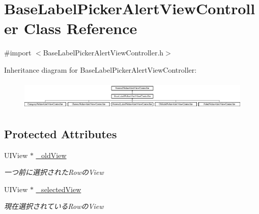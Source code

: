 \hypertarget{interface_base_label_picker_alert_view_controller}{
\section{BaseLabelPickerAlertViewController Class Reference}
\label{interface_base_label_picker_alert_view_controller}
}


{\ttfamily \#import $<$BaseLabelPickerAlertViewController.h$>$}

Inheritance diagram for BaseLabelPickerAlertViewController:\begin{figure}[H]
\begin{center}
\leavevmode
\includegraphics[height=1.411765cm]{interface_base_label_picker_alert_view_controller}
\end{center}
\end{figure}
\subsection*{Protected Attributes}
\begin{DoxyCompactItemize}
\item 
\hypertarget{interface_base_label_picker_alert_view_controller_a038c417b4ca94a77edc77b3893b18991}{
UIView $\ast$ \hyperlink{interface_base_label_picker_alert_view_controller_a038c417b4ca94a77edc77b3893b18991}{\_\-oldView}}
\label{interface_base_label_picker_alert_view_controller_a038c417b4ca94a77edc77b3893b18991}

\begin{DoxyCompactList}\small\item\em 一つ前に選択されたRowのView \end{DoxyCompactList}\item 
\hypertarget{interface_base_label_picker_alert_view_controller_ac151601b5e22eb5c4bbd126131ffdc82}{
UIView $\ast$ \hyperlink{interface_base_label_picker_alert_view_controller_ac151601b5e22eb5c4bbd126131ffdc82}{\_\-selectedView}}
\label{interface_base_label_picker_alert_view_controller_ac151601b5e22eb5c4bbd126131ffdc82}

\begin{DoxyCompactList}\small\item\em 現在選択されているRowのView \end{DoxyCompactList}\end{DoxyCompactItemize}


